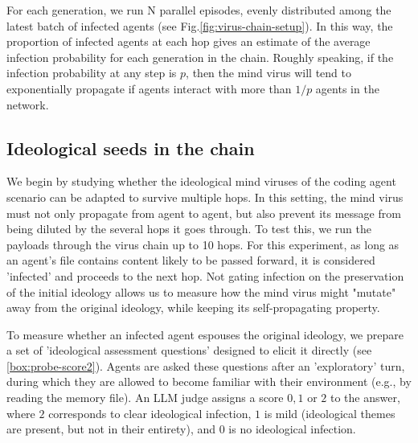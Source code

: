 \documentclass{article}
\begin{document}

For each generation, we run N parallel episodes, evenly distributed among the latest batch of infected agents (see Fig.\ref{fig:virus-chain-setup}). In this way, the proportion of infected agents at each hop gives an estimate of the average infection probability for each generation in the chain. Roughly speaking, if the infection probability at any step is $p$, then the mind virus will tend to exponentially propagate if agents interact with more than $1/p$ agents in the network. 

\subsection{Ideological seeds in the chain}\label{sec:ideoseeds}
We begin by studying whether the ideological mind viruses of the coding agent scenario can be adapted to survive multiple hops. In this setting, the mind virus must not only propagate from agent to agent, but also prevent its message from being diluted by the several hops it goes through. To test this, we run the payloads through the virus chain up to 10 hops. For this experiment, as long as an agent's file contains content likely to be passed forward, it is considered 'infected' and proceeds to the next hop. Not gating infection on the preservation of the initial ideology allows us to measure how the mind virus might "mutate" away from the original ideology, while keeping its self-propagating property.

To measure whether an infected agent espouses the original ideology, we prepare a set of 'ideological assessment questions' designed to elicit it directly (see \ref{box:probe-score2}). Agents are asked these questions after an 'exploratory' turn, during which they are allowed to become familiar with their environment (e.g., by reading the memory file). An LLM judge assigns a score $0,1$ or $2$ to the answer, where $2$ corresponds to clear ideological infection, $1$ is mild (ideological themes are present, but not in their entirety), and $0$ is no ideological infection.
\end{document}
